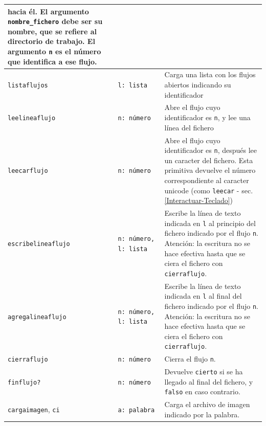 \begin{center}
\begin{longtable}{|m{3cm}|m{32mm}|m{9cm}|}
        hacia \'el. El argumento \texttt{nombre\_fichero} debe ser su nombre,
        que se refiere al directorio de trabajo. El argumento \texttt{n} es
        el n\'umero que identifica a ese flujo. \\ \hline 
   \texttt{listaflujos} \index{listaflujos@\texttt{listaflujos}} &
      \texttt{l: lista} &
        Carga una lista con los flujos abiertos indicando su identificador
                        \\ \hline 
   \texttt{leelineaflujo} \index{leelineaflujo@\texttt{leelineaflujo}} &
      \texttt{n: n\'umero} &
        Abre el flujo cuyo identificador es \texttt{n}, y lee una l\'inea del
        fichero \\ \hline 
   \texttt{leecarflujo} \index{leecarflujo@\texttt{leecarflujo}} &
      \texttt{n: n\'umero}&
        Abre el flujo cuyo identificador es \texttt{n}, despu\'es lee un
        caracter del fichero. Esta primitiva devuelve el n\'umero
        correspondiente al caracter unicode (como \texttt{leecar} -
        sec. \ref{Interactuar-Teclado}) \\ \hline 
   \texttt{escribelineaflujo}%
      \index{escribelineaflujo@\texttt{escribelineaflujo}} &
      \texttt{n:~{}n\'umero, l:~lista} & 
        Escribe la l\'inea de texto indicada en \texttt{l} al principio del
        fichero indicado por el flujo \texttt{n}. Atenci\'on: la escritura no
        se hace efectiva hasta que se ciera el fichero con
        \texttt{cierraflujo}. \\ \hline 
   \texttt{agregalineaflujo}%
     \index{agregalineaflujo@\texttt{agregalineaflujo}} &
       \texttt{n:~{}n\'umero, l:~lista} &
        Escribe la l\'inea de texto indicada en \texttt{l} al final del
        fichero indicado por el flujo \texttt{n}. Atenci\'on: la escritura
        no se hace efectiva hasta que se ciera el fichero con
        \texttt{cierraflujo}.\\ \hline 
   \texttt{cierraflujo} \index{cierraflujo@\texttt{cierraflujo}} &
      \texttt{n: n\'umero}& Cierra el flujo \texttt{n}. \\ \hline 
   \texttt{finflujo?} \index{finflujo?@\texttt{finflujo?}} &
      \texttt{n: n\'umero}&
        Devuelve \texttt{cierto} si se ha llegado al final del fichero, y
        \texttt{falso} en caso contrario.\\ \hline
   \texttt{cargaimagen}, \index{cargaimagen@\texttt{cargaimagen}}
     \texttt{ci} \index{ci@\texttt{ci}} &  \texttt{a: palabra} &
          Carga el archivo de imagen indicado por la palabra. \\ \hline 
\end{longtable} \end{center}

